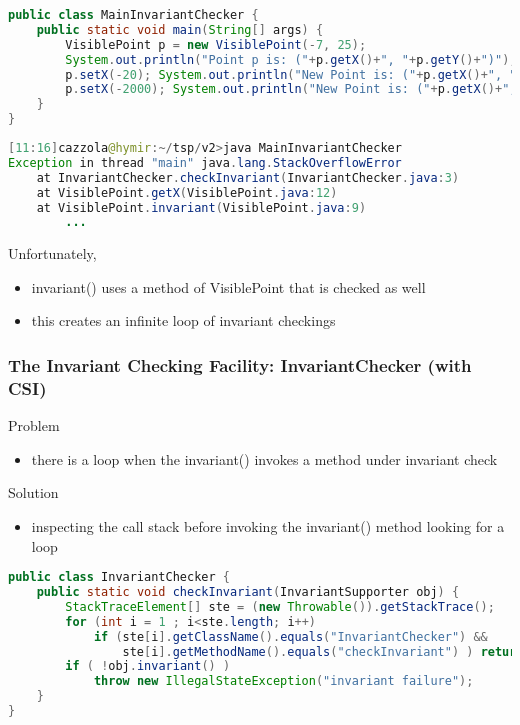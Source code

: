 \begin{lstlisting}[language=Java]
public class MainInvariantChecker {
	public static void main(String[] args) {
		VisiblePoint p = new VisiblePoint(-7, 25);
		System.out.println("Point p is: ("+p.getX()+", "+p.getY()+")");
		p.setX(-20); System.out.println("New Point is: ("+p.getX()+", "+p.getY()+")");
		p.setX(-2000); System.out.println("New Point is: ("+p.getX()+", "+p.getY()+")");
	}
}
\end{lstlisting}

\begin{lstlisting}[language=Java]
[11:16]cazzola@hymir:~/tsp/v2>java MainInvariantChecker
Exception in thread "main" java.lang.StackOverflowError
	at InvariantChecker.checkInvariant(InvariantChecker.java:3)
	at VisiblePoint.getX(VisiblePoint.java:12)
	at VisiblePoint.invariant(VisiblePoint.java:9)
		...
\end{lstlisting}

Unfortunately,
\begin{itemize}
	\item invariant() uses a method of VisiblePoint that is checked as well
	\item this creates an infinite loop of invariant checkings
\end{itemize}

\subsubsection{The Invariant Checking Facility: InvariantChecker (with CSI)}

Problem
\begin{itemize}
	\item there is a loop when the invariant() invokes a method under invariant check
\end{itemize}

Solution
\begin{itemize}
	\item inspecting the call stack before invoking the invariant() method looking for a loop
\end{itemize}

\begin{lstlisting}[language=Java]
public class InvariantChecker {
	public static void checkInvariant(InvariantSupporter obj) {
		StackTraceElement[] ste = (new Throwable()).getStackTrace();
		for (int i = 1 ; i<ste.length; i++)
			if (ste[i].getClassName().equals("InvariantChecker") &&
				ste[i].getMethodName().equals("checkInvariant") ) return ;
		if ( !obj.invariant() )
			throw new IllegalStateException("invariant failure");
	}
}
\end{lstlisting}

